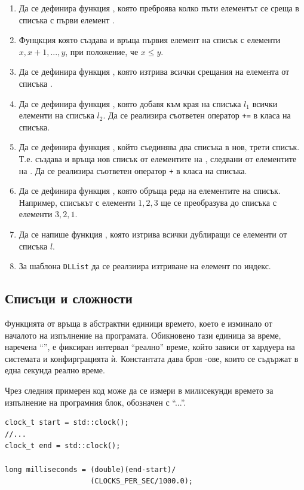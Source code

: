\begin{enumerate}

	\item  Да се дефинира функция , която преброява колко пъти елементът  се среща в списъка с първи елемент .
	\item  Фунцкция  която създава и връща първия елемент на списък с елементи $x, x+1, ..., y$, при положение, че $x \leq y$.
	\item  Да се дефинира функция , която изтрива всички срещания на елемента  от списъка .
	\item  Да се дефинира функция , която добавя към края на списъка $l_1$ всички елементи на списъка $l_2$. Да се реализира съответен оператор \texttt{+=} в класа на списъка.
	\item  Да се дефинира функция , който съединява два списъка в нов, трети списък. Т.е.  създава и връща нов списък от елементите на , следвани от елементите на . Да се реализира съответен оператор \texttt{+} в класа на списъка.
	\item  Да се дефинира функция , която обръща реда на елементите на списък. Например, списъкът с елементи $1,2,3$ ще се преобразува до списъка с елементи $3,2,1$.
	\item Да се напише функция , която изтрива всички дублиращи се елементи от списъка $l$.
  \item За шаблона \texttt{DLList} да се реалзиира изтриване на елемент по индекс.
\end{enumerate}

\subsection {Списъци и сложности}
\label{timing}
\begin{mdframed}[hidealllines=true,backgroundcolor=gray!20]
Функцията  от  връща в абстрактни единици времето, което е изминало от началото на изпълнение на програмата. Обикновено тази единица за време, наречена ``'', е фиксиран интервал ``реално'' време, който зависи от хардуера на системата и конфирграцията ѝ. Константата  дава броя -ове, които се съдържат в една секунда реално време.

Чрез следния примерен код може да се измери в милисекунди времето за изпълнение на програмния блок, обозначен с ``...''.
\begin{verbatim}
clock_t start = std::clock();
//...
clock_t end = std::clock();

long milliseconds = (double)(end-start)/
                    (CLOCKS_PER_SEC/1000.0);

\end{verbatim}
\end{mdframed}

